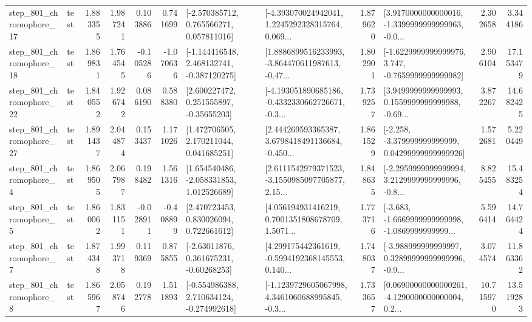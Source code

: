 \begin{tabular}{llrrrrllrlrr}
  step\_801\_chromophore\_17 &      test &      1.883355 &    1.987241 &      0.103886 &  0.741699 &    [-2.570385712, 0.765566271, 0.057811016] &  [-4.393070024942041, 1.2245292328315764, 0.069... &       1.879620 &  [3.9170000000000016, -1.3399999999999963, -0.0... &            2.302658 &          3.344186 \\
  step\_801\_chromophore\_18 &      test &      1.869831 &    1.764545 &     -0.105286 & -1.070636 &   [-1.144416548, 2.468132741, -0.387120275] &  [1.8886899516233993, -3.864470611987613, -0.47... &       1.802901 &  [-1.6229999999999976, 3.747, -0.7659999999999982] &            2.906104 &         17.153479 \\
  step\_801\_chromophore\_22 &      test &      1.840552 &    1.926742 &      0.086190 &  0.588380 &     [2.600227472, 0.251555897, -0.35655203] &  [-4.193051890685186, -0.4332330662726671, -0.3... &       1.739257 &  [3.9499999999999993, 0.1559999999999988, -0.69... &            3.872267 &         14.682425 \\
  step\_801\_chromophore\_27 &      test &      1.891437 &    2.044874 &      0.153437 &  1.171026 &     [1.472706505, 2.170211044, 0.041685251] &  [2.444269593365387, 3.6798418491136684, -0.450... &       1.861529 &  [-2.258, -3.379999999999999, 0.04299999999999926] &            1.572681 &          5.220449 \\
   step\_801\_chromophore\_4 &      test &      1.869505 &    2.067987 &      0.198482 &  1.561316 &    [1.654540486, -2.058331853, 1.012526689] &  [2.6111542979371523, -3.1550985097705877, 2.15... &       1.848635 &  [-2.2959999999999994, 3.2129999999999996, -0.8... &            8.825455 &         15.483254 \\
   step\_801\_chromophore\_5 &      test &      1.860062 &    1.831151 &     -0.028911 & -0.408899 &     [2.470723453, 0.830026094, 0.722661612] &  [4.056194931416219, 0.7001351808678709, 1.5071... &       1.773716 &  [-3.683, -1.6669999999999998, -1.0869999999999... &            5.596414 &         14.764424 \\
   step\_801\_chromophore\_7 &      test &      1.874348 &    1.993718 &      0.119369 &  0.875855 &     [-2.63011876, 0.361675231, -0.60268253] &  [4.299175442361619, -0.5994192368145553, 0.140... &       1.748037 &  [-3.988999999999997, 0.32899999999999996, -0.9... &            3.074574 &         11.863362 \\
   step\_801\_chromophore\_8 &      test &      1.865967 &    2.058746 &      0.192778 &  1.511893 &   [-0.554986388, 2.710634124, -0.274992618] &  [-1.1239729605067998, 4.3461060688995845, -0.3... &       1.733657 &  [0.06900000000000261, -4.1290000000000004, 0.2... &           10.715970 &         13.519283 \\

\end{tabular}
